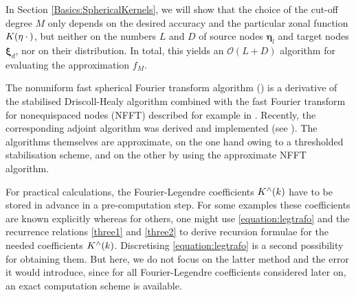 \documentclass[11pt,a4paper,twoside,bibtotoc]{scrartcl}
\theoremstyle{plain}
\theoremstyle{definition}
\theoremstyle{remark}
\newcommand{\fun}[2]{\ensuremath{#1{\hspace{-0.4ex}}\left(#2\right)}}
\numberwithin{equation}{section}
\numberwithin{table}{section}
\numberwithin{figure}{section}
\begin{document}
In Section \ref{Basics:SphericalKernels}, we will show that the choice 
of the cut-off degree $M$ only depends on the desired accuracy
and the particular zonal function $\fun{K}{\mathbf{\eta} \: \cdot \,}$, but neither
on the numbers $L$ and $D$ of source nodes $\mathbf{\eta}_{l}$ and target nodes 
$\mathbf{\xi}_{d}$, nor on their distribution.
In total, this yields an $\mathcal{O}\left(L + D\right)$ algorithm for evaluating the 
approximation $f_{M}$.

The nonuniform fast spherical Fourier transform algorithm (\cite{kupo02}) is 
a derivative of the stabilised Driscoll-Healy algorithm \cite{drhe,postta97}
combined with the fast Fourier transform for nonequispaced nodes (NFFT)
described for example in \cite{postta01}. Recently, the corresponding adjoint 
algorithm was derived and implemented (see \cite{keiner05}). The algorithms 
themselves are approximate, on the one hand owing to a thresholded 
stabilisation scheme, and on the other by using the approximate
NFFT algorithm.

For practical calculations, the Fourier-Legendre coefficients 
$\fun{K^{\wedge}}{k}$ have to be stored in advance in a pre-computation step. 
For some examples these coefficients are known explicitly whereas for others, one might use \eqref{equation:legtrafo}
and the recurrence relations \eqref{three1} and \eqref{three2} to derive
recursion formulae for the needed coefficients $\fun{K^{\wedge}}{k}$.
Discretising \eqref{equation:legtrafo} is a second possibility for obtaining them.
But here, we do not focus on the latter method and the error it would introduce, since for all Fourier-Legendre coefficients considered later on, an exact computation scheme is available.
\end{document}
